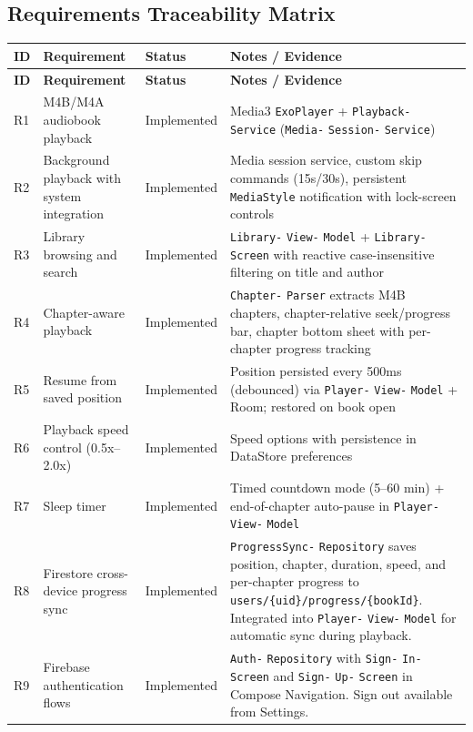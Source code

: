 \documentclass[11pt,a4paper]{article}
\begin{document}
\subsection{Requirements Traceability Matrix}

{\footnotesize
\begin{longtable}{|p{0.8cm}|>{\RaggedRight}p{4.5cm}|>{\RaggedRight}p{2.5cm}|>{\RaggedRight}p{5.5cm}|}
\hline
\textbf{ID} & \textbf{Requirement} & \textbf{Status} & \textbf{Notes / Evidence} \\ \hline
\endfirsthead
\hline
\textbf{ID} & \textbf{Requirement} & \textbf{Status} & \textbf{Notes / Evidence} \\ \hline
\endhead
R1 & M4B/M4A audiobook playback & Implemented & Media3 \texttt{ExoPlayer} + \texttt{Playback-} \texttt{Service} (\texttt{Media-} \texttt{Session-} \texttt{Service}) \\ \hline
R2 & Background playback with system integration & Implemented & Media session service, custom skip commands (15s/30s), persistent \texttt{MediaStyle} notification with lock-screen controls \\ \hline
R3 & Library browsing and search & Implemented & \texttt{Library-} \texttt{View-} \texttt{Model} + \texttt{Library-} \texttt{Screen} with reactive case-insensitive filtering on title and author \\ \hline
R4 & Chapter-aware playback & Implemented & \texttt{Chapter-} \texttt{Parser} extracts M4B chapters, chapter-relative seek/progress bar, chapter bottom sheet with per-chapter progress tracking \\ \hline
R5 & Resume from saved position & Implemented & Position persisted every 500ms (debounced) via \texttt{Player-} \texttt{View-} \texttt{Model} + Room; restored on book open \\ \hline
R6 & Playback speed control (0.5x--2.0x) & Implemented & Speed options with persistence in DataStore preferences \\ \hline
R7 & Sleep timer & Implemented & Timed countdown mode (5--60 min) + end-of-chapter auto-pause in \texttt{Player-} \texttt{View-} \texttt{Model} \\ \hline
R8 & Firestore cross-device progress sync & Implemented & \texttt{ProgressSync-} \texttt{Repository} saves position, chapter, duration, speed, and per-chapter progress to \texttt{users/\{uid\}/progress/\{bookId\}}. Integrated into \texttt{Player-} \texttt{View-} \texttt{Model} for automatic sync during playback. \\ \hline
R9 & Firebase authentication flows & Implemented & \texttt{Auth-} \texttt{Repository} with \texttt{Sign-} \texttt{In-} \texttt{Screen} and \texttt{Sign-} \texttt{Up-} \texttt{Screen} in Compose Navigation. Sign out available from Settings. \\ \hline

\end{longtable}}
\end{document}

